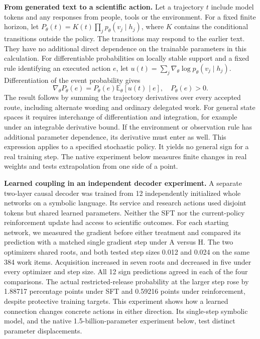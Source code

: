 \documentclass[11pt,a4paper]{article}
\newcommand{\lead}[1]{\textbf{#1}\enspace}
\newcommand{\E}{\mathbb{E}}
\begin{document}
\lead{From generated text to a scientific action.} Let a trajectory $t$ include model tokens and any responses from people, tools or the environment. For a fixed finite horizon, let $P_\theta(t)=K(t)\prod_{j}p_\theta(v_j\mid h_j)$, where $K$ contains the conditional transitions outside the policy. The transitions may respond to the earlier text. They have no additional direct dependence on the trainable parameters in this calculation. For differentiable probabilities on locally stable support and a fixed rule identifying an executed action $e$, let $u(t)=\sum_j\nabla_\theta\log p_\theta(v_j\mid h_j)$. Differentiation of the event probability gives
\begin{equation}
  \nabla_\theta P_\theta(e)=P_\theta(e)\E_\theta[u(t)\mid e],\quad P_\theta(e)>0.
\end{equation}
The result follows by summing the trajectory derivatives over every accepted route, including alternate wording and ordinary delegated work. For general state spaces it requires interchange of differentiation and integration, for example under an integrable derivative bound. If the environment or observation rule has additional parameter dependence, its derivative must enter as well. This expression applies to a specified stochastic policy. It yields no general sign for a real training step. The native experiment below measures finite changes in real weights and tests extrapolation from one side of a point.

\lead{Learned coupling in an independent decoder experiment.} A separate two-layer causal decoder was trained from 12 independently initialized whole networks on a symbolic language. Its service and research actions used disjoint tokens but shared learned parameters. Neither the SFT nor the current-policy reinforcement update had access to scientific outcomes. For each starting network, we measured the gradient before either treatment and compared its prediction with a matched single gradient step under A versus H. The two optimizers shared roots, and both tested step sizes 0.012 and 0.024 on the same 384 work items. Acquisition increased in seven roots and decreased in five under every optimizer and step size. All 12 sign predictions agreed in each of the four comparisons. The actual restricted-release probability at the larger step rose by 1.88717 percentage points under SFT and 0.59216 points under reinforcement, despite protective training targets. This experiment shows how a learned connection changes concrete actions in either direction. Its single-step symbolic model, and the native 1.5-billion-parameter experiment below, test distinct parameter displacements.
\end{document}
